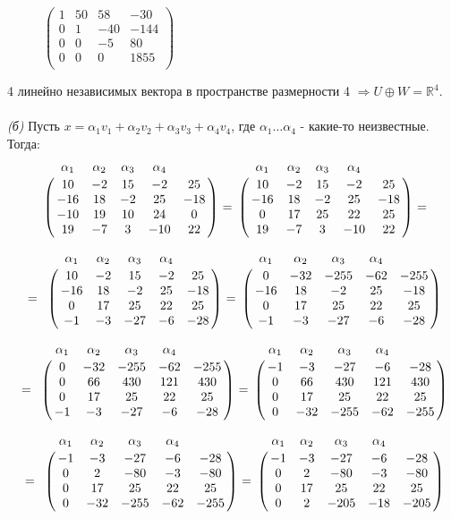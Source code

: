 \documentclass[10pt]{article}
\begin{document}
\begin{figure}[H]
\text{ = }
$\begin{pmatrix}
1 & 50 & 58 & -30 \\
0 & 1 & -40 & -144 \\
0 & 0 & -5 & 80 \\
0 & 0 & 0 & 1855 \\
\end{pmatrix}$
\end{figure}
4 линейно независимых вектора в пространстве размерности 4 $\Rightarrow U \oplus W = \mathbb{R}^4$. \\ \\
\textsl{(б)} Пусть $x = \alpha_1 v_1 + \alpha_2 v_2 + \alpha_3 v_3 + \alpha_4 v_4$, где $\alpha_1 \dots \alpha_4$ - какие-то неизвестные. Тогда: 
\[
\bordermatrix{
	& \alpha_1 & \alpha_2 & \alpha_3 & \alpha_4 & \cr
	& 10 & -2 & 15 & -2 & 25 \cr
	& -16 & 18 & -2 & 25 & -18 \cr
	& -10 & 19 & 10 & 24 & 0 \cr
	& 19 & -7 & 3 & -10 & 22 \cr
}
\text{  =}
\bordermatrix{
	& \alpha_1 & \alpha_2 & \alpha_3 & \alpha_4 & \cr
	& 10 & -2 & 15 & -2 & 25 \cr
	& -16 & 18 & -2 & 25 & -18 \cr
	& 0 & 17 & 25 & 22 & 25 \cr
	& 19 & -7 & 3 & -10 & 22 \cr
}
\text{  =}
\]

\[
\text{ = }
\bordermatrix{
	& \alpha_1 & \alpha_2 & \alpha_3 & \alpha_4 & \cr
	& 10 & -2 & 15 & -2 & 25 \cr
	& -16 & 18 & -2 & 25 & -18 \cr
	& 0 & 17 & 25 & 22 & 25 \cr
	& -1 & -3 & -27 & -6 & -28 \cr
}
\text{ =}
\bordermatrix{
& \alpha_1 & \alpha_2 & \alpha_3 & \alpha_4 & \cr
& 0 & -32 & -255 & -62 & -255 \cr
& -16 & 18 & -2 & 25 & -18 \cr
& 0 & 17 & 25 & 22 & 25 \cr
& -1 & -3 & -27 & -6 & -28 \cr
}
\]

\[
\text{ = }
\bordermatrix{
	& \alpha_1 & \alpha_2 & \alpha_3 & \alpha_4 & \cr
	& 0 & -32 & -255 & -62 & -255 \cr
	& 0 & 66 & 430 & 121 & 430 \cr
	& 0 & 17 & 25 & 22 & 25 \cr
	& -1 & -3 & -27 & -6 & -28 \cr
}
\text{  =}
\bordermatrix{
	& \alpha_1 & \alpha_2 & \alpha_3 & \alpha_4 & \cr
	& -1 & -3 & -27 & -6 & -28 \cr
	& 0 & 66 & 430 & 121 & 430 \cr
	& 0 & 17 & 25 & 22 & 25 \cr
	& 0 & -32 & -255 & -62 & -255 \cr
}
\]

\[
\text{ = }
\bordermatrix{
	& \alpha_1 & \alpha_2 & \alpha_3 & \alpha_4 & \cr
	& -1 & -3 & -27 & -6 & -28 \cr
	& 0 & 2 & -80 & -3 & -80 \cr
	& 0 & 17 & 25 & 22 & 25 \cr
	& 0 & -32 & -255 & -62 & -255 \cr
}
\text{  =}
\bordermatrix{
& \alpha_1 & \alpha_2 & \alpha_3 & \alpha_4 & \cr
& -1 & -3 & -27 & -6 & -28 \cr
& 0 & 2 & -80 & -3 & -80 \cr
& 0 & 17 & 25 & 22 & 25 \cr
& 0 & 2 & -205 & -18 & -205 \cr
}
\]
\end{document}
